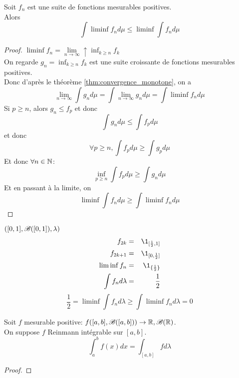 \begin{theorem}
	Soit $f_n$ est une suite de fonctions mesurables positives.\\
	Alors
	$$ \int \liminf f_n d\mu \leq \liminf \int f_n d\mu $$
\end{theorem}

\begin{proof}
	$\liminf f_n = \lim\limits_{n \to \infty} \uparrow \inf_{k \geq n} f_k$\\
	On regarde $g_n = \inf_{k \geq n} f_k$ est une suite croissante de fonctions mesurables positives.\\
	Donc d'après le théorème \ref{thm:convergence_monotone}, on a
	$$ \lim\limits_{n \to \infty} \int g_n d\mu = \int \lim\limits_{n \to \infty} g_n d\mu = \int \liminf f_n d\mu $$
	Si $p \geq n$, alors $g_n \leq f_p$ et donc
	$$ \int g_n d\mu \leq \int f_p d\mu $$
	et donc
	$$ \forall p \geq n, \int f_p d\mu \geq \int g_p d\mu $$
	Et donc $\forall n \in \mathbb{N}$:
	$$ \inf_{p \geq n} \int f_p d\mu \geq \int g_n d\mu $$
	Et en passant à la limite, on
	$$ \liminf \int f_n d\mu \geq \int \liminf f_n d\mu $$
\end{proof}


\begin{example} $([0,1], \mathscr{B}([0,1]),\lambda)$\\
	\begin{eqnarray*}
		f_{2k} &=& \1_{[\frac{1}{2}, 1]}\\
		f_{2k+1} &=& \1_{[0,\frac{1}{2}]}\\
		\liminf f_n &=& \1_{\{\frac{1}{2}\}}\\
		\int f_n d \lambda &=& \frac{1}{2}
	\end{eqnarray*}
	$$ \frac{1}{2} = \liminf \int f_n d \lambda \geq \int \liminf f_n d \lambda = 0 $$
\end{example}


\begin{theorem}
	Soit $f$ mesurable positive:
	$ f ([a,b], \mathscr{B}([a,b])) \to \mathbb{R}, \mathscr{B}(\mathbb{R})$.\\
	On suppose $f$ Reinmann intégrable sur $[a,b]$.\\
	$$ \int_a^b f(x) dx = \int_{[a,b]} f d\lambda $$
\end{theorem}

\begin{proof} %





\end{proof}

